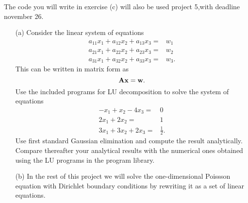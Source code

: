 \documentclass[11pt,a4wide]{article}
\begin{document}
The code you will write in exercise (c) will also be used project 5,with deadline november 26.
\begin{enumerate}
\item[(a)] 
Consider the linear system of equations 
%
\begin{eqnarray}
 a_{11}x_1 +a_{12}x_2 +a_{13}x_3 =&w_1 \nonumber \\
a_{21}x_1 + a_{22}x_2 + a_{23}x_3=&w_2 \nonumber \\
a_{31}x_1 + a_{32}x_2 + a_{33}x_3=&w_3. \nonumber 
\end{eqnarray}
This can be written in matrix form as
\[
   {\bf Ax}={\bf w}.
\]
Use the included programs for LU decomposition to solve the system of equations
\begin{eqnarray}
 -x_1 +x_2 -4x_3 =&0 \nonumber \\
  2x_1 + 2x_2 =&1 \nonumber \\
3x_1 + 3x_2 + 2x_3=&\frac{1}{2}. \nonumber 
\end{eqnarray}
Use first standard Gaussian elimination and compute the result
analytically. Compare thereafter your analytical results with
the numerical ones obtained using the LU programs in the program library.

\item[(b)] 
In the rest of this project we will solve the one-dimensional Poissson equation
with Dirichlet boundary conditions by rewriting it as a set of linear equations.


\end{enumerate}
\end{document}

